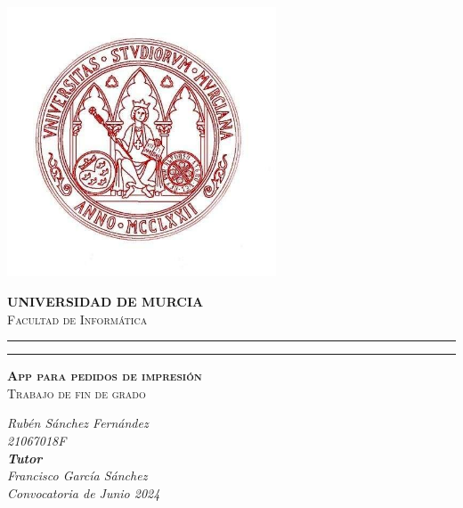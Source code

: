 \documentclass[12pt]{article}
\begin{document}
\begin{titlepage}
    \begin{center}

        {\phantom{a}\par}

        \includegraphics[width=0.6\textwidth]{imagenes/logo.jpg}

        \scshape\Large\textbf{UNIVERSIDAD DE MURCIA}
        \\\scshape\Large Facultad de Informática

        \rule{\linewidth}{0.1pt}
        \rule{\linewidth}{0.1pt}

        \vspace{1cm}
        \scshape\huge\textbf{App para pedidos de impresión}\\
        \scshape\Large Trabajo de fin de grado


        \vspace{1.5cm}

        \itshape\large
        Rubén Sánchez Fernández\\
        21067018F\\

        \vspace{0.5cm}
        \textbf{Tutor}\\
        \itshape\large
        Francisco García Sánchez\\



        \vfill
        {\large Convocatoria de Junio 2024}
    \end{center}
\end{titlepage}

\pagestyle{empty}
\tableofcontents
\newpage
\listoffigures
\newpage
\clearpage
\pagestyle{fancy}
\setcounter{page}{1}
\end{document}
